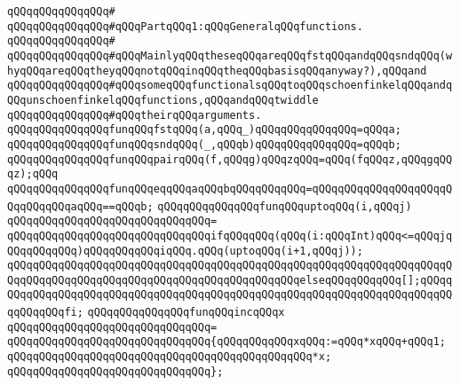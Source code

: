 \verb|qQQqqQQqqQQqqQQq#|\newline
\verb|qQQqqQQqqQQqqQQq#qQQqPartqQQq1:qQQqGeneralqQQqfunctions.|\newline
\verb|qQQqqQQqqQQqqQQq#|\newline
\verb|qQQqqQQqqQQqqQQq#qQQqMainlyqQQqtheseqQQqareqQQqfstqQQqandqQQqsndqQQq(whyqQQqareqQQqtheyqQQqnotqQQqinqQQqtheqQQqbasisqQQqanyway?),qQQqand|\newline
\verb|qQQqqQQqqQQqqQQq#qQQqsomeqQQqfunctionalsqQQqtoqQQqschoenfinkelqQQqandqQQqunschoenfinkelqQQqfunctions,qQQqandqQQqtwiddle|\newline
\verb|qQQqqQQqqQQqqQQq#qQQqtheirqQQqarguments.|\newline
\newline
\newline
\verb|qQQqqQQqqQQqqQQqfunqQQqfstqQQq(a,qQQq_)qQQqqQQqqQQqqQQq=qQQqa;|\newline
\verb|qQQqqQQqqQQqqQQqfunqQQqsndqQQq(_,qQQqb)qQQqqQQqqQQqqQQq=qQQqb;|\newline
\verb|qQQqqQQqqQQqqQQqfunqQQqpairqQQq(f,qQQqg)qQQqzqQQq=qQQq(fqQQqz,qQQqgqQQqz);qQQq|\newline
\newline
\verb|qQQqqQQqqQQqqQQqfunqQQqeqqQQqaqQQqbqQQqqQQqqQQq=qQQqqQQqqQQqqQQqqQQqqQQqqQQqqQQqaqQQq==qQQqb;|\newline
\newline
\verb|qQQqqQQqqQQqqQQqfunqQQquptoqQQq(i,qQQqj)|\newline
\verb|qQQqqQQqqQQqqQQqqQQqqQQqqQQqqQQq=|\newline
\verb|qQQqqQQqqQQqqQQqqQQqqQQqqQQqqQQqifqQQqqQQq(qQQq(i:qQQqInt)qQQq<=qQQqjqQQqqQQqqQQq)qQQqqQQqqQQqiqQQq.qQQq(uptoqQQq(i+1,qQQqj));|\newline
\verb|qQQqqQQqqQQqqQQqqQQqqQQqqQQqqQQqqQQqqQQqqQQqqQQqqQQqqQQqqQQqqQQqqQQqqQQqqQQqqQQqqQQqqQQqqQQqqQQqqQQqqQQqqQQqqQQqqQQqelseqQQqqQQqqQQq[];qQQqqQQqqQQqqQQqqQQqqQQqqQQqqQQqqQQqqQQqqQQqqQQqqQQqqQQqqQQqqQQqqQQqqQQqqQQqqQQqqQQqfi;|\newline
\newline
\verb|qQQqqQQqqQQqqQQqfunqQQqincqQQqx|\newline
\verb|qQQqqQQqqQQqqQQqqQQqqQQqqQQqqQQq=|\newline
\verb|qQQqqQQqqQQqqQQqqQQqqQQqqQQqqQQq{qQQqqQQqqQQqxqQQq:=qQQq*xqQQq+qQQq1;|\newline
\verb|qQQqqQQqqQQqqQQqqQQqqQQqqQQqqQQqqQQqqQQqqQQqqQQq*x;|\newline
\verb|qQQqqQQqqQQqqQQqqQQqqQQqqQQqqQQq};|\newline
